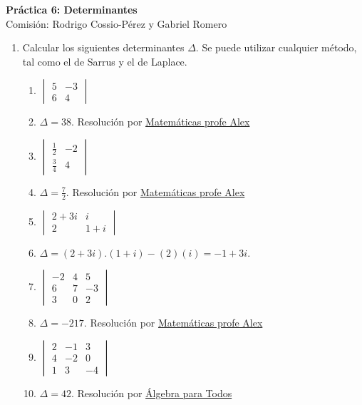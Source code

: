 \documentclass[a4paper]{article}
\newcommand{\answer}{\item[**]}
\newcommand{\exercise}{\item}
\begin{document}
\noindent \hrulefill 
\vspace{-7pt}
\begin{center} 
	\textbf{ Práctica 6: Determinantes } \\
	Comisión: Rodrigo Cossio-Pérez y Gabriel Romero
\end{center}
\vspace{-10pt}
\hrulefill


\begin{enumerate}

	\exercise Calcular los siguientes determinantes $\Delta$. Se puede utilizar cualquier método, tal como el de Sarrus y el de Laplace.
	\begin{multicols}{3}
	\begin{enumerate} [label=(\alph*)]
		
		\item $\begin{vmatrix} 5 & -3 \\ 6 & 4\end{vmatrix}$
		\answer $\Delta=38$. Resolución por \href{https://youtu.be/bsUUVmeqsdY?t=104}{Matemáticas profe Alex}

		\item $\begin{vmatrix} \frac{1}{2} & -2 \\ \frac{3}{4} & 4\end{vmatrix}$
		\answer $\Delta=\frac{7}{2}$. Resolución por \href{https://youtu.be/bsUUVmeqsdY?t=237}{Matemáticas profe Alex}

		\item $\begin{vmatrix} 2+3i & i \\ 2 & 1+i\end{vmatrix}$
		\answer $\Delta=(2+3i).(1+i)-(2)(i)=-1+3i$. 

		\item $\begin{vmatrix} -2 & 4 & 5 \\ 6 & 7 & -3 \\ 3 & 0 & 2 \end{vmatrix}$
		\answer $\Delta=-217$. Resolución por \href{https://youtu.be/8OnOZvc5rFQ}{Matemáticas profe Alex}

		\item $\begin{vmatrix} 2 & -1 & 3 \\ 4 & -2 & 0 \\ 1 & 3 & -4 \end{vmatrix}$
		\answer $\Delta=42$. Resolución por \href{https://youtu.be/0iXeaZwPkzo}{Álgebra para Todos}


\end{enumerate}
\end{multicols}
\end{enumerate}
\end{document}
